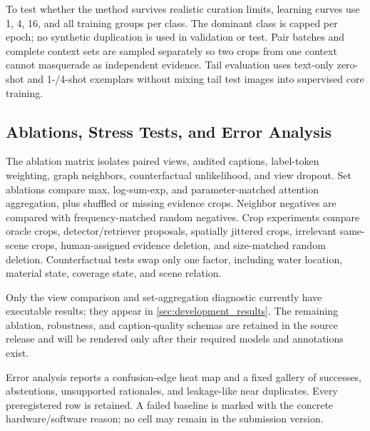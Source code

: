 To test whether the method survives realistic curation limits, learning curves use 1, 4, 16, and all training groups per class. The dominant class is capped per epoch; no synthetic duplication is used in validation or test. Pair batches and complete context sets are sampled separately so two crops from one context cannot masquerade as independent evidence. Tail evaluation uses text-only zero-shot and 1-/4-shot exemplars without mixing tail test images into supervised core training.

\subsection{Ablations, Stress Tests, and Error Analysis}

The ablation matrix isolates paired views, audited captions, label-token weighting, graph neighbors, counterfactual unlikelihood, and view dropout. Set ablations compare max, log-sum-exp, and parameter-matched attention aggregation, plus shuffled or missing evidence crops. Neighbor negatives are compared with frequency-matched random negatives. Crop experiments compare oracle crops, detector/retriever proposals, spatially jittered crops, irrelevant same-scene crops, human-assigned evidence deletion, and size-matched random deletion. Counterfactual tests swap only one factor, including water location, material state, coverage state, and scene relation.

Only the view comparison and set-aggregation diagnostic currently have executable results; they appear in \cref{sec:development_results}. The remaining ablation, robustness, and caption-quality schemas are retained in the source release and will be rendered only after their required models and annotations exist.

Error analysis reports a confusion-edge heat map and a fixed gallery of successes, abstentions, unsupported rationales, and leakage-like near duplicates. Every preregistered row is retained. A failed baseline is marked with the concrete hardware/software reason; no \tbd cell may remain in the submission version.
